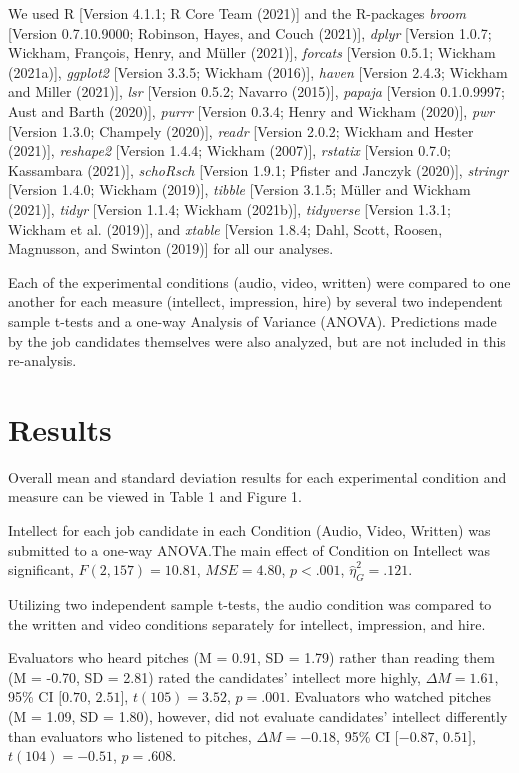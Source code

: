 \documentclass[
  english,
  man]{apa6}
\begin{document}
We used R {[}Version 4.1.1; R Core Team (2021){]} and the R-packages \emph{broom} {[}Version 0.7.10.9000; Robinson, Hayes, and Couch (2021){]}, \emph{dplyr} {[}Version 1.0.7; Wickham, François, Henry, and Müller (2021){]}, \emph{forcats} {[}Version 0.5.1; Wickham (2021a){]}, \emph{ggplot2} {[}Version 3.3.5; Wickham (2016){]}, \emph{haven} {[}Version 2.4.3; Wickham and Miller (2021){]}, \emph{lsr} {[}Version 0.5.2; Navarro (2015){]}, \emph{papaja} {[}Version 0.1.0.9997; Aust and Barth (2020){]}, \emph{purrr} {[}Version 0.3.4; Henry and Wickham (2020){]}, \emph{pwr} {[}Version 1.3.0; Champely (2020){]}, \emph{readr} {[}Version 2.0.2; Wickham and Hester (2021){]}, \emph{reshape2} {[}Version 1.4.4; Wickham (2007){]}, \emph{rstatix} {[}Version 0.7.0; Kassambara (2021){]}, \emph{schoRsch} {[}Version 1.9.1; Pfister and Janczyk (2020){]}, \emph{stringr} {[}Version 1.4.0; Wickham (2019){]}, \emph{tibble} {[}Version 3.1.5; Müller and Wickham (2021){]}, \emph{tidyr} {[}Version 1.1.4; Wickham (2021b){]}, \emph{tidyverse} {[}Version 1.3.1; Wickham et al. (2019){]}, and \emph{xtable} {[}Version 1.8.4; Dahl, Scott, Roosen, Magnusson, and Swinton (2019){]} for all our analyses.

Each of the experimental conditions (audio, video, written) were compared to one another for each measure (intellect, impression, hire) by several two independent sample t-tests and a one-way Analysis of Variance (ANOVA). Predictions made by the job candidates themselves were also analyzed, but are not included in this re-analysis.

\hypertarget{results}{%
\section{Results}\label{results}}

Overall mean and standard deviation results for each experimental condition and measure can be viewed in Table 1 and Figure 1.

Intellect for each job candidate in each Condition (Audio, Video, Written) was submitted to a one-way ANOVA.The main effect of Condition on Intellect was significant, \(F(2, 157) = 10.81\), \(\mathit{MSE} = 4.80\), \(p < .001\), \(\hat{\eta}^2_G = .121\).

Utilizing two independent sample t-tests, the audio condition was compared to the written and video conditions separately for intellect, impression, and hire.

Evaluators who heard pitches (M = 0.91, SD = 1.79) rather than reading them (M = -0.70, SD = 2.81) rated the candidates' intellect more highly, \(\Delta M = 1.61\), 95\% CI \([0.70\), \(2.51]\), \(t(105) = 3.52\), \(p = .001\). Evaluators who watched pitches (M = 1.09, SD = 1.80), however, did not evaluate candidates' intellect differently than evaluators who listened to pitches, \(\Delta M = -0.18\), 95\% CI \([-0.87\), \(0.51]\), \(t(104) = -0.51\), \(p = .608\).
\end{document}
